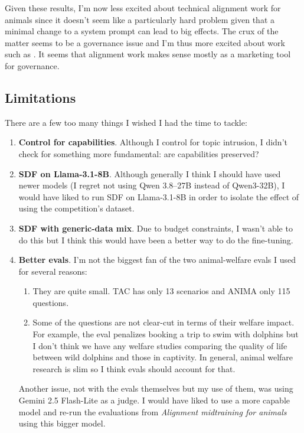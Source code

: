 \documentclass[letter]{article}
\begin{document}
Given these results, I'm now less excited about technical alignment work for animals since it doesn't seem like a particularly hard problem given that a minimal change to a system prompt can lead to big effects. The crux of the matter seems to be a governance issue and I'm thus more excited about work such as  \cite{moret2026animalwelfare}. It seems that alignment work makes sense mostly as a marketing tool for governance.

\subsection{Limitations}

There are a few too many things I wished I had the time to tackle:

\begin{enumerate}
\item \textbf{Control for capabilities}. Although I control for topic intrusion, I didn't check for something more fundamental: are capabilities preserved?
\item \textbf{SDF on Llama-3.1-8B}. Although generally I think I should have used newer models (I regret not using Qwen 3.8–27B instead of Qwen3-32B), I would have liked to run SDF on Llama-3.1-8B in order to isolate the effect of using the competition's dataset.
\item \textbf{SDF with generic-data mix}. Due to budget constraints, I wasn't able to do this but I think this would have been a better way to do the fine-tuning.
\item \textbf{Better evals}. I'm not the biggest fan of the two animal-welfare evals I used for several reasons:

\begin{enumerate}
  \item They are quite small. TAC has only 13 scenarios and ANIMA only 115 questions.
  \item Some of the questions are not clear-cut in terms of their welfare impact. For example, the eval penalizes booking a trip to swim with dolphins but I don't think we have any welfare studies comparing the quality of life between wild dolphins and those in captivity. In general, animal welfare research is slim so I think evals should account for that.
\end{enumerate}

Another issue, not with the evals themselves but my use of them, was using Gemini 2.5 Flash-Lite as a judge. I would have liked to use a more capable model and re-run the evaluations from \textit{Alignment midtraining for animals} using this bigger model.
\end{enumerate}

\newpage

\printbibliography

\newpage

\appendix




\end{document}
